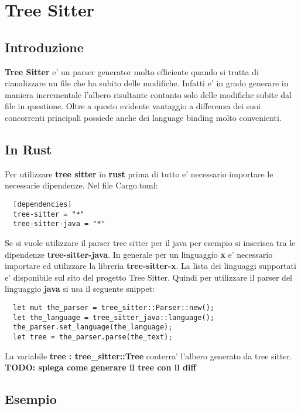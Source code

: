 \chapter{Tree Sitter}

\section{Introduzione}

\textbf{Tree Sitter} e' un parser generator molto efficiente quando si tratta di rianalizzare un file che ha subito delle modifiche.
Infatti e' in grado generare in maniera incrementale l'albero risultante contanto solo delle modifiche subite dal file in questione.
Oltre a questo evidente vantaggio a differenza dei suoi concorrenti principali possiede anche dei language binding molto convenienti.

\section{In Rust}

Per utilizzare \textbf{tree sitter} in \textbf{rust} prima di tutto e' necessario importare le necessarie dipendenze. Nel file Cargo.toml:

\begin{verbatim}
  [dependencies]
  tree-sitter = "*"
  tree-sitter-java = "*"
\end{verbatim}

Se si vuole utilizzare il parser tree sitter per il java per esempio si inserisca tra le dipendenze \textbf{tree-sitter-java}. In generale per un linguaggio \textbf{x} e' necessario importare ed utilizzare la libreria \textbf{tree-sitter-x}. La lista dei linguaggi supportati e' disponibile sul sito del progetto Tree Sitter.
Quindi per utilizzare il parser del linguaggio \textbf{java} si usa il seguente snippet:

\begin{verbatim}
  let mut the_parser = tree_sitter::Parser::new();
  let the_language = tree_sitter_java::language();
  the_parser.set_language(the_language);
  let tree = the_parser.parse(the_text);
\end{verbatim}

La variabile \textbf{tree : tree\_sitter::Tree} conterra' l'albero generato da tree sitter.
\textbf{TODO: spiega come generare il tree con il diff}

\section{Esempio}


